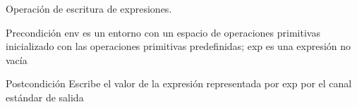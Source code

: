 Operación de escritura de expresiones. 

\begin{DoxyPrecond}{Precondición}
\textquotesingle{}env\textquotesingle{} es un entorno con un espacio de operaciones primitivas inicializado con las operaciones primitivas predefinidas; \textquotesingle{}exp\textquotesingle{} es una expresión no vacía 
\end{DoxyPrecond}
\begin{DoxyPostcond}{Postcondición}
Escribe el valor de la expresión representada por \textquotesingle{}exp\textquotesingle{} por el canal estándar de salida 
\end{DoxyPostcond}
